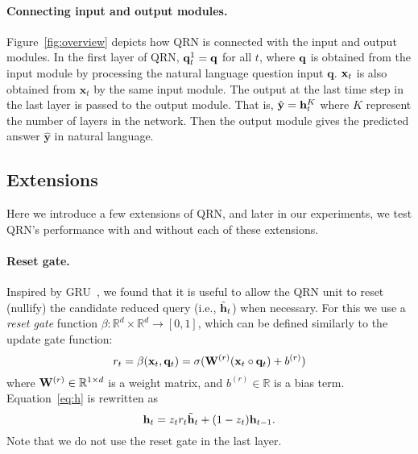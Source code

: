 \documentclass[table]{article}
\begin{document}
\paragraph{Connecting input and output modules.}
Figure~\ref{fig:overview} depicts how QRN is connected with the input and output modules. 
In the first layer of QRN, ${\bf q}^1_t = {\bf q}$ for all $t$, where ${\bf q}$ is obtained from the input module by processing the natural language question input ${\bm q}$.
${\bf x}_t$ is also obtained from ${\bm x}_t$ by the same input module.
The output at the last time step in the last layer is passed to the output module.
That is, ${\hat {\bf y}} = {\bf h}^K_t$ where $K$ represent the number of layers in the network.
Then the output module gives the predicted answer ${\hat {\bm y}}$ in natural language.













\subsection{Extensions}\label{sec:var}
Here we introduce a few extensions of QRN, and later in our experiments, we test QRN's performance with and without each of these extensions.

\paragraph{Reset gate.} Inspired by GRU~\citep{GRU}, we found that it is useful to allow the QRN unit to reset (nullify) the candidate reduced query (i.e., ${\tilde {\bf h}}_t$) when necessary.
For this we use a \emph{reset gate} function $\beta : \mathbb{R}^d \times \mathbb{R}^d \rightarrow [0,1]$, which can be defined similarly to the update gate function:
\begin{equation}\label{eq:r}
r_t = \beta({\bf x}_t, {\bf q}_t) = \sigma({\bf W}^{(r)} ({\bf x}_t \circ {\bf q}_t) + b^{(r)})
\end{equation}
where ${\bf W}^{(r)} \in \mathbb{R}^{1 \times d}$ is a weight matrix, and $b^{(r)} \in \mathbb{R}$ is a bias term. 
Equation~\ref{eq:h} is rewritten as
\begin{equation}\label{eq:hr}
{\bf h}_t = z_t r_t {\tilde {\bf h}}_t + (1 - z_t) {\bf h}_{t-1}.
\end{equation}
Note that we do not use the reset gate in the last layer.
\end{document}
